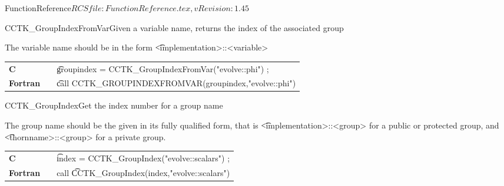 \begin{cactuspart}{5}{FunctionReference}{$RCSfile: FunctionReference.tex,v $}{$Revision: 1.45 $}
\begin{CCTKFunc}{CCTK\_GroupIndexFromVar}{Given a variable name, returns the index of the associated group}
\label{CCTK-GroupIndexFromVar}
\showargs
\begin{params}
\end{params}
\begin{discussion}
The variable name should be in the form {\t <implementation>::<variable>}
\end{discussion}
\begin{examples}
\begin{tabular}{@{}p{3cm}cp{11cm}}
\hfill {\bf C} && {\t groupindex = CCTK\_GroupIndexFromVar("evolve::phi") ;}
\\
\hfill {\bf Fortran} && {\t call CCTK\_GROUPINDEXFROMVAR(groupindex,"evolve::phi")}
\\
\end{tabular}
\end{examples}
\begin{errorcodes}
\end{errorcodes}
\end{CCTKFunc}




\begin{CCTKFunc}{CCTK\_GroupIndex}{Get the index number for a group name}
\label{CCTK-GroupIndex}
\showargs
\begin{params}
\end{params}
\begin{discussion}
The group name should be the given in its fully qualified form, that is {\t <implementation>::<group>} for a public or protected group, and {\t <thornname>::<group>} for a private group.
\end{discussion}
\begin{examples}
\begin{tabular}{@{}p{3cm}cp{11cm}}
\hfill {\bf C} && {\t index = CCTK\_GroupIndex("evolve::scalars") };
\\
\hfill {\bf Fortran} && call {\t CCTK\_GroupIndex(index,"evolve::scalars")}
\\
\end{tabular}
\end{examples}
\begin{errorcodes}
\end{errorcodes}
\end{CCTKFunc}



\end{cactuspart}
